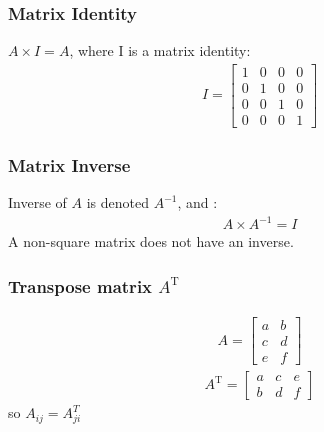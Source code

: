 \documentclass[a4paper,12pt]{report}
\begin{document}
\begin{appendices}
\subsubsection{Matrix Identity}
$A \times I = A$, where I is a matrix identity:
\begin{align*}
		I = \begin{bmatrix} 1 & 0 &0 & 0\\ 0 & 1 &0 & 0\\ 0 & 0 &1 & 0\\ 0 & 0 &0 &1  \end{bmatrix}
\end{align*}
\subsubsection{Matrix Inverse}
Inverse of $A$ is denoted $A^{-1}$, and : 
\begin{align*}
		A \times A^{-1} = I
\end{align*}
A non-square matrix does not have an inverse.

\subsubsection{Transpose matrix $A^{\mathrm{T}}$}
\begin{align*}
		A = \begin{bmatrix} a & b \\ c & d \\ e & f  \end{bmatrix}
\end{align*}
\begin{align*}
		A^{\mathrm{T}} = \begin{bmatrix} a & c & e \\ b & d & f  \end{bmatrix}
\end{align*}
so $A_{ij} = A_{ji} ^{T}$


\end{appendices}
\end{document}
